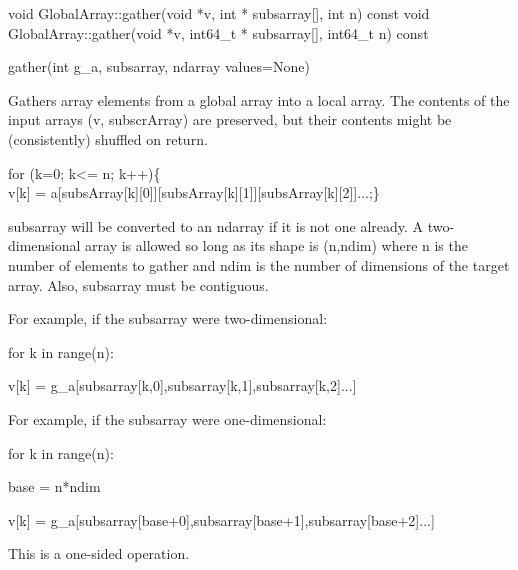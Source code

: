 \documentclass[12pt]{article}
\begin{document}
\begin{cxxapi}
\begin{cxxcode}
void GlobalArray::gather(void *v, int * subsarray[], int n) const
void GlobalArray::gather(void *v, int64_t * subsarray[], int64_t n) const
\end{cxxcode}
\begin{funcargs}
\end{funcargs}
\end{cxxapi}

\begin{pyapi}
\begin{pycode}
gather(int g_a, subsarray, ndarray values=None)
\end{pycode}
\end{pyapi}
\ncoll

\begin{desc}

Gathers array elements from a global array into a local array. The
contents of the input arrays (v, subscrArray) are preserved, but their
contents might be (consistently) shuffled on return.


for (k=0; k<= n; k++)\{\\v[k] = a[subsArray[k][0]][subsArray[k][1]][subsArray[k][2]]...;\}\

subsarray will be converted to an ndarray if it is not one already.
A two-dimensional array is allowed so long as its shape is (n,ndim)
where n is the number of elements to gather and ndim is the number
of dimensions of the target array. Also, subsarray must be contiguous.

For example, if the subsarray were two-dimensional:

for k in range(n):

    v[k] = g_a[subsarray[k,0],subsarray[k,1],subsarray[k,2]...]

For example, if the subsarray were one-dimensional:


for k in range(n):

    base = n*ndim

    v[k] = g_a[subsarray[base+0],subsarray[base+1],subsarray[base+2]...]



This is a one-sided operation.

\end{desc}

\end{document}
